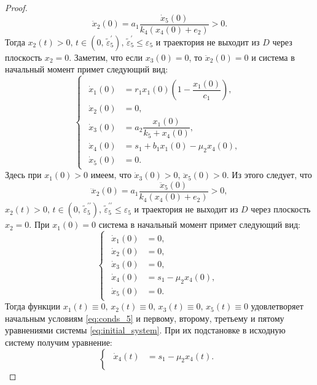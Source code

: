 \documentclass[14pt,a4paper]{extarticle}
\begin{document}
\begin{proof}
		\[\ddot{x}_2(0) = a_1\dfrac{\dot{x}_5(0)}{k_4(x_4(0)+e_2)} > 0.\]
		Тогда $x_2(t)>0,\, t\in(0,\, \tilde{\varepsilon}^{\prime}_5),\,\tilde{\varepsilon}^{\prime}_5\le\varepsilon_5$ и траектория не выходит из $D$ через плоскость $x_2=0$. Заметим, что если $x_3(0)=0$, то $\ddot{x}_2(0)=0$ и система в начальный момент примет следующий вид:
		\begin{equation*}
			\begin{cases}
				\begin{aligned}
					\dot{x}_1(0) &= r_1x_1(0)\left(1-\dfrac{x_1(0)}{c_1}\right),\\
					\dot{x}_2(0) &= 0,\\
					\dot{x}_3(0) &= a_2\dfrac{x_1(0)}{k_5+x_4(0)},\\
					\dot{x}_4(0) &= s_1 + b_1x_1(0)-\mu_2x_4(0),\\
					\dot{x}_5(0) &= 0.
				\end{aligned}
			\end{cases}
		\end{equation*} 
		Здесь при $x_1(0)>0$ имеем, что $\dot{x}_3(0)>0,\,\ddot{x}_5(0)>0$. Из этого следует, что
		\[\dddot{x}_2(0) = a_1\dfrac{\ddot{x}_5(0)}{k_4(x_4(0)+e_2)}>0,\]
		$x_2(t)>0,\, t\in(0,\, \tilde{\varepsilon}^{\prime\prime}_5),\,\tilde{\varepsilon}^{\prime\prime}_5\le\varepsilon_5$ и траектория не выходит из $D$ через плоскость $x_2=0$. При $x_1(0)=0$ система в начальный момент примет следующий вид:
		\begin{equation*}
			\begin{cases}
				\begin{aligned}
					\dot{x}_1(0) &= 0,\\
					\dot{x}_2(0) &= 0,\\
					\dot{x}_3(0) &= 0,\\
					\dot{x}_4(0) &= s_1 - \mu_2x_4(0),\\
					\dot{x}_5(0) &= 0.
				\end{aligned}
			\end{cases}
		\end{equation*}
		Тогда функции $x_1(t)\equiv0,\, x_2(t)\equiv0,\, x_3(t)\equiv0,\, x_5(t)\equiv0$ удовлетворяет начальным условиям \ref{eq:conds_5} и первому, второму, третьему и пятому уравнениями системы \ref{eq:initial_system}. При их подстановке в исходную систему получим уравнение:
		\begin{equation*}
			\begin{cases}
				\begin{aligned}
					\dot{x}_4(t) &= s_1-\mu_2x_4(t).\\

\end{aligned}
\end{cases}
\end{equation*}
\end{proof}
\end{document}
